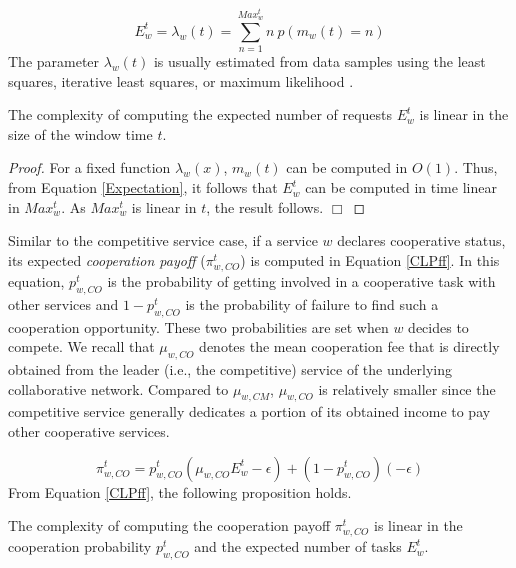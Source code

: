 \begin{equation}\label{Expectation}
E^t_w = \lambda_w(t) = \sum_{n=1}^{Max_w^t} n \ p(m_w(t) = n)
\end{equation}
%
The parameter $\lambda_w(t)$ is usually estimated from data
samples using the least squares, iterative least squares, or
maximum likelihood \cite{DBLP:journals/telsys/MasseyPW96}.

\begin{proposition}\label{Complexity-Expectation}
The complexity of computing the expected number of requests
$E^t_w$ is linear in the size of the window time $t$.
\end{proposition}


\begin{proof}
For a fixed function $\lambda_w(x)$, $m_w(t)$ can be computed in
$O(1)$. Thus, from Equation \ref{Expectation}, it follows that
$E^t_w$ can be computed in time linear in $Max_w^t$. As $Max_w^t$
is linear in $t$, the result follows. $\Box$
\end{proof}

Similar to the competitive service case, if a service $w$ declares
cooperative status, its expected \emph{cooperation payoff}
($\pi_{w,CO}^t$) is computed in Equation \ref{CLPff}. In this
equation, $p_{w,CO}^t$ is the probability of getting involved in a
cooperative task with other services and $1-p_{w,CO}^t$ is the
probability of failure to find such a cooperation opportunity.
These two probabilities are set when $w$ decides to compete. We
recall that $\mu_{w, CO}$ denotes the mean cooperation fee that is
directly obtained from the leader (i.e., the competitive) service
of the underlying collaborative network. Compared to $\mu_{w,
CM}$, $\mu_{w, CO}$ is relatively smaller since the competitive
service generally dedicates a portion of its obtained income to
pay other cooperative services.


\begin{equation}\label{CLPff}
\pi_{w,CO}^t=p_{w,CO}^t (\mu_{w,
CO}E^t_w-\epsilon)+(1-p_{w,CO}^t)(-\epsilon)
\end{equation}
%
From Equation \ref{CLPff}, the following proposition holds.

\begin{proposition}\label{Complexity-Cooperation_Payoff}
The complexity of computing the cooperation payoff $\pi_{w,CO}^t$
is linear in the cooperation probability $p_{w,CO}^t$ and the
expected number of tasks $E^t_w$.
\end{proposition}


